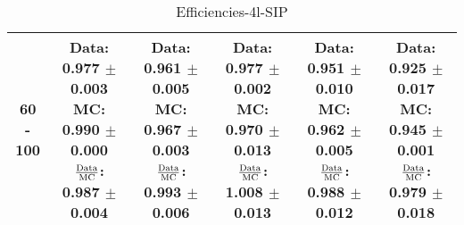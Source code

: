 \documentclass[final,letterpaper,twoside,12pt]{article}
\begin{document}
\begin{table}[htbp]
\begin{adjustwidth}{-4em}{-4em}
\begin{tabular}{|c|c|c|c|c|c|}
60 - 100 & \parbox[c]{1.1 in}{ \scriptsize  Data: 0.977 $\pm$ 0.003 \newline MC: 0.990 $\pm$ 0.000 \newline $\frac{\rm{Data}}{\rm{MC}}$: 0.987 $\pm$ 0.004} & \parbox[c]{1.1 in}{ \scriptsize  Data: 0.961 $\pm$ 0.005 \newline MC: 0.967 $\pm$ 0.003 \newline $\frac{\rm{Data}}{\rm{MC}}$: 0.993 $\pm$ 0.006} & \parbox[c]{1.1 in}{ \scriptsize  Data: 0.977 $\pm$ 0.002 \newline MC: 0.970 $\pm$ 0.013 \newline $\frac{\rm{Data}}{\rm{MC}}$: 1.008 $\pm$ 0.013} & \parbox[c]{1.1 in}{ \scriptsize  Data: 0.951 $\pm$ 0.010 \newline MC: 0.962 $\pm$ 0.005 \newline $\frac{\rm{Data}}{\rm{MC}}$: 0.988 $\pm$ 0.012} & \parbox[c]{1.1 in}{ \scriptsize  Data: 0.925 $\pm$ 0.017 \newline MC: 0.945 $\pm$ 0.001 \newline $\frac{\rm{Data}}{\rm{MC}}$: 0.979 $\pm$ 0.018}\\ \hline 
\end{tabular}
\caption {Efficiencies-4l-SIP}
\label{tab:cqdata0}
\end{adjustwidth}\end{table}
\end{document}

